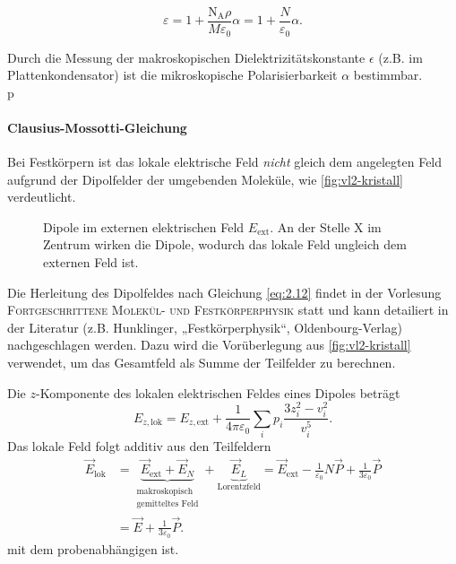     \begin{important}
        \begin{equation}
            \varepsilon = 1 + \frac{\text{N}_{\text{A}} \rho}{M \varepsilon_0} \alpha = 1 + \frac{N}{ \varepsilon_0} \alpha.
            \label{eq:2.11}
        \end{equation}
    \end{important}
    
    Durch die Messung der makroskopischen Dielektrizitätskonstante $\epsilon$ (z.B. im Plattenkondensator) ist die mikroskopische Polarisierbarkeit $\alpha$ bestimmbar.\\
p
\paragraph{Clausius-Mossotti-Gleichung}
    Bei Festkörpern ist das lokale elektrische Feld \emph{nicht} gleich dem angelegten Feld aufgrund der Dipolfelder der umgebenden Moleküle, wie \autoref{fig:vl2-kristall} verdeutlicht.\\
    \begin{figure}[H]
        \centering
        \caption{Dipole im externen elektrischen Feld $E_\text{ext}$. An der Stelle X im Zentrum wirken die Dipole, wodurch das lokale Feld ungleich dem externen Feld ist.}
        \label{fig:vl2-kristall}
    \end{figure} 
    \begin{verbal}
        Die Herleitung des Dipolfeldes nach Gleichung \eqref{eq:2.12} findet in der Vorlesung \textsc{Fortgeschrittene Molekül- und Festkörperphysik} statt und kann detailiert in der Literatur (z.B. Hunklinger, „Festkörperphysik“, Oldenbourg-Verlag) nachgeschlagen werden. Dazu wird die Vorüberlegung aus \autoref{fig:vl2-kristall} verwendet, um das Gesamtfeld als Summe der Teilfelder zu berechnen.
    \end{verbal}
    Die $z$-Komponente des lokalen elektrischen Feldes eines Dipoles beträgt
    $$
    E_{z, \text{lok}} = E_{z, \text{ext}} + \frac{1}{4 \pi \varepsilon_{0}} \sum_{i}^{} p_{i} \frac{3 z_{i}^2 - v_{i}^2}{v_{i}^{5}}.
    $$
    Das lokale Feld folgt additiv aus den Teilfeldern
    \begin{align}\nonumber
    	\vec{E}_{\text{lok}} 
        &= \underbrace{\vec{E}_\text{ext}+ {\vec{E}_{N}}}_{\substack{\text{makroskopisch}\\\text{gemitteltes Feld}}} 
            + \underbrace{\vec{E}_{L}}_\text{Lorentzfeld} 
            = \vec{E}_{\text{ext}} 
            - {\frac{1}{\varepsilon_0}N\vec{P}}
            + \frac{1}{3 \varepsilon_0} \vec{P} \\
    	&= \vec{E} + \frac{1}{3 \varepsilon_0} \vec{P}.\label{eq:2.12}
    \end{align}
    mit dem probenabhängigen  ist.
    
